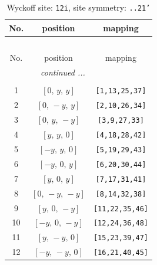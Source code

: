 \documentclass[fleqn,8pt]{jsarticle}
\begin{document}
\begin{longtable}{ccc}
\caption{Wyckoff site: {\tt 12i}, site symmetry: {\tt ..21'}}
 \\
 \hline \hline
No. & position & mapping \\ \hline \endfirsthead

\multicolumn{2}{l}{\tablename\ \thetable{}} \\
 \hline \hline
No. & position & mapping \\ \hline \endhead

 \hline \hline
\multicolumn{2}{r}{\footnotesize\it continued ...} \\ \endfoot

 \hline \hline
\multicolumn{2}{r}{} \\ \endlastfoot

1 & $\left[ 0,\, y,\, y \right]$ & {\tt [1,13,25,37]} \\ \hline
2 & $\left[ 0,\, - y,\, y \right]$ & {\tt [2,10,26,34]} \\ \hline
3 & $\left[ 0,\, y,\, - y \right]$ & {\tt [3,9,27,33]} \\ \hline
4 & $\left[ y,\, y,\, 0 \right]$ & {\tt [4,18,28,42]} \\ \hline
5 & $\left[ - y,\, y,\, 0 \right]$ & {\tt [5,19,29,43]} \\ \hline
6 & $\left[ - y,\, 0,\, y \right]$ & {\tt [6,20,30,44]} \\ \hline
7 & $\left[ y,\, 0,\, y \right]$ & {\tt [7,17,31,41]} \\ \hline
8 & $\left[ 0,\, - y,\, - y \right]$ & {\tt [8,14,32,38]} \\ \hline
9 & $\left[ y,\, 0,\, - y \right]$ & {\tt [11,22,35,46]} \\ \hline
10 & $\left[ - y,\, 0,\, - y \right]$ & {\tt [12,24,36,48]} \\ \hline
11 & $\left[ y,\, - y,\, 0 \right]$ & {\tt [15,23,39,47]} \\ \hline
12 & $\left[ - y,\, - y,\, 0 \right]$ & {\tt [16,21,40,45]} \\
\end{longtable}
\renewcommand{\arraystretch}{1.2}
\end{document}
